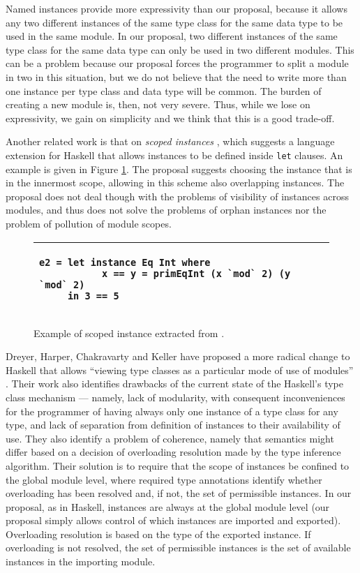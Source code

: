 \documentclass[msc]{ppgccufmg}
\begin{document}
{Named instances provide more expressivity than our proposal, because it allows
any two different instances of the same type class for the same data type to be
used in the same module.  In our proposal, two different instances of the same
type class for the same data type can only be used in two different modules.
This can be a problem because our proposal forces the programmer to split a
module in two in this situation, but we do not believe that the need to
write more than one instance per type class and data type will be common. The
burden of creating a new module is, then, not very severe.  Thus, while we lose on expressivity,
we gain on simplicity and we think that this is a good trade-off.

Another related work is that on \emph{scoped instances} \citep{scoped}, which
suggests a language extension for Haskell that allows instances to be
defined inside \texttt{let} clauses. An example is given in Figure \ref{scoped}. The
proposal suggests choosing the instance that is in the innermost scope,
allowing in this scheme also overlapping instances. The proposal does not
deal though with the problems of visibility of instances across modules, and
thus does not solve the problems of orphan instances nor the problem of
pollution of module scopes.

\begin{figure}
\caption{Example of scoped instance extracted from \citep[section~6]{scoped}.\label{scoped}}
\begin{tabular}{|p{\textwidth}|}
\hline
\begin{verbatim}
e2 = let instance Eq Int where
           x == y = primEqInt (x `mod` 2) (y `mod` 2)
     in 3 == 5
\end{verbatim}
\\
\hline
\end{tabular}
\end{figure}

Dreyer, Harper, Chakravarty and Keller have proposed a more radical
change to Haskell that allows ``viewing type classes as a particular
mode of use of modules'' \citep{modular}. Their work also identifies
drawbacks of the current state of the Haskell's type class mechanism
--- namely, lack of modularity, with consequent inconveniences for the
programmer of having always only one instance of a type class for any
type, and lack of separation from definition of instances to their
availability of use. They also identify a problem of coherence, namely
that semantics might differ based on a decision of overloading
resolution made by the type inference algorithm. Their solution is to
require that the scope of instances be confined to the global module
level, where required type annotations identify whether overloading
has been resolved and, if not, the set of permissible instances. In
our proposal, as in Haskell, instances are always at the global module
level (our proposal simply allows control of which instances are
imported and exported). Overloading resolution is based on the type of
the exported instance. If overloading is not resolved, the set of
permissible instances is the set of available instances in the
importing module.

}
\end{document}
